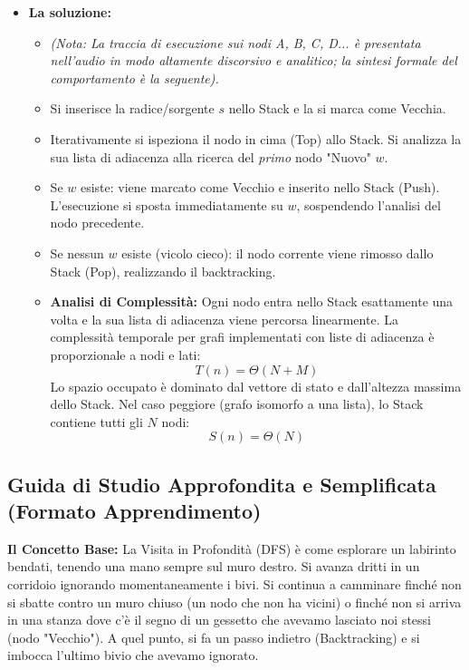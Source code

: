 \documentclass[a4paper, 11pt]{report}
\begin{document}
\begin{itemize}
\item \textbf{La soluzione:}
\begin{itemize}
    \item \textit{(Nota: La traccia di esecuzione sui nodi A, B, C, D... è presentata nell'audio in modo altamente discorsivo e analitico; la sintesi formale del comportamento è la seguente).}
    \item Si inserisce la radice/sorgente $s$ nello Stack e la si marca come Vecchia.
    \item Iterativamente si ispeziona il nodo in cima (Top) allo Stack. Si analizza la sua lista di adiacenza alla ricerca del \textit{primo} nodo "Nuovo" $w$.
    \item Se $w$ esiste: viene marcato come Vecchio e inserito nello Stack (Push). L'esecuzione si sposta immediatamente su $w$, sospendendo l'analisi del nodo precedente.
    \item Se nessun $w$ esiste (vicolo cieco): il nodo corrente viene rimosso dallo Stack (Pop), realizzando il backtracking.
    \item \textbf{Analisi di Complessità:} Ogni nodo entra nello Stack esattamente una volta e la sua lista di adiacenza viene percorsa linearmente. La complessità temporale per grafi implementati con liste di adiacenza è proporzionale a nodi e lati:
    \[ T(n) = \Theta(N + M) \]
    Lo spazio occupato è dominato dal vettore di stato e dall'altezza massima dello Stack. Nel caso peggiore (grafo isomorfo a una lista), lo Stack contiene tutti gli $N$ nodi:
    \begin{equation*}
    S(n) = \Theta(N)
    \end{equation*}
\end{itemize}
\end{itemize}

\vspace{0.5cm}
\subsection*{Guida di Studio Approfondita e Semplificata (Formato Apprendimento)}


\textbf{Il Concetto Base:}
La Visita in Profondità (DFS) è come esplorare un labirinto bendati, tenendo una mano sempre sul muro destro. Si avanza dritti in un corridoio ignorando momentaneamente i bivi. Si continua a camminare finché non si sbatte contro un muro chiuso (un nodo che non ha vicini) o finché non si arriva in una stanza dove c'è il segno di un gessetto che avevamo lasciato noi stessi (nodo "Vecchio"). A quel punto, si fa un passo indietro (Backtracking) e si imbocca l'ultimo bivio che avevamo ignorato.
\end{document}
